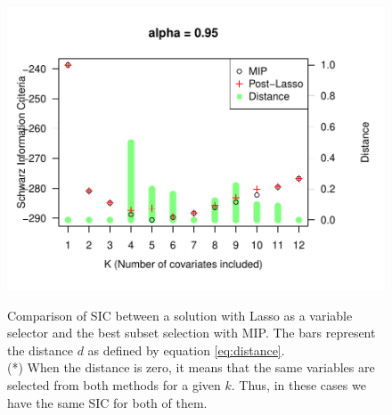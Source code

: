 \begin{figure}
\begin{minipage}[t]{0.4\linewidth}
\begin{minipage}[b]{\linewidth}
      \centering     \includegraphics[width=\textwidth]{Figuras/SIC095.pdf}
      \label{fig:npqar-cross}
     \end{minipage}
  \end{minipage}
  \caption{Comparison of SIC between a solution with Lasso as a variable selector and the best subset selection with MIP. The bars represent the distance $d$ as defined by equation \ref{eq:distance}. \\ (*) When the distance is zero, it means that the same variables are selected from both methods for a given $k$. Thus, in these cases we have the same SIC for both of them.}
  \label{fig:comparison-lm-results}
\end{figure}


